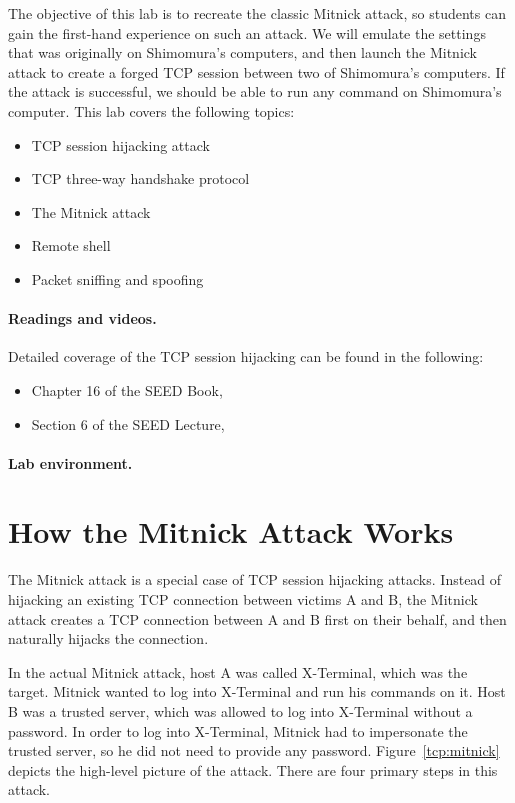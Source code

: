 The objective of this lab is to recreate the classic Mitnick attack, 
so students can gain the first-hand experience on such an attack. 
We will emulate the settings that was originally on 
Shimomura's computers, and then 
launch the Mitnick attack to create a forged TCP session between
two of Shimomura's computers. If the attack is successful, 
we should be able to run any command on Shimomura's computer. 
This lab covers the following topics:

\begin{itemize}[noitemsep]
\item TCP session hijacking attack
\item TCP three-way handshake protocol
\item The Mitnick attack
\item Remote shell \rsh
\item Packet sniffing and spoofing
\end{itemize}


\paragraph{Readings and videos.}
Detailed coverage of the TCP session hijacking can be found in the following:

\begin{itemize}
\item Chapter 16 of the SEED Book, \seedbook
\item Section 6 of the SEED Lecture, \seedisvideo
\end{itemize}

\paragraph{Lab environment.} \seedenvironmentB



\section{How the Mitnick Attack Works}

The Mitnick attack is a special case of TCP session hijacking attacks. 
Instead of hijacking an existing TCP connection between victims A and B, 
the Mitnick attack creates a TCP connection between A and B first on 
their behalf, and then naturally hijacks the connection.  


In the actual Mitnick attack, host A was called X-Terminal, 
which was the target. Mitnick
wanted to log into X-Terminal and run his commands on it. 
Host B was a trusted server, which was allowed to log into X-Terminal without a password.  
In order to log into X-Terminal, Mitnick had to impersonate the trusted server, so
he did not need to provide any password. Figure~\ref{tcp:mitnick} depicts
the high-level picture of the attack. 
There are four primary steps in this attack.



